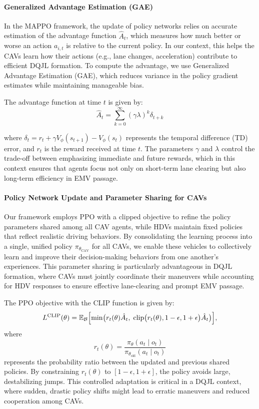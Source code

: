\paragraph{Generalized Advantage Estimation (GAE)}
In the MAPPO framework, the update of policy networks relies on accurate estimation of the advantage function $\hat{A}_t$, which measures how much better or worse an action $a_{i,t}$ is relative to the current policy. In our context, this helps the CAVs learn how their actions (e.g., lane changes, acceleration) contribute to efficient DQJL formation. To compute the advantage, we use Generalized Advantage Estimation (GAE), which reduces variance in the policy gradient estimates while maintaining manageable bias.

The advantage function at time $t$ is given by:
\begin{equation}\label{eqn:gae}
\hat{A}_t = \sum_{k=0}^{\infty} (\gamma \lambda)^k \delta_{t+k}
\end{equation}


where $\delta_t = r_t + \gamma V_{\phi}(s_{t+1}) - V_{\phi}(s_t)$ represents the temporal difference (TD) error, and $r_t$ is the reward received at time $t$. The parameters $\gamma$ and $\lambda$ control the trade-off between emphasizing immediate and future rewards, which in this context ensures that agents focus not only on short-term lane clearing but also long-term efficiency in EMV passage.


\paragraph{Policy Network Update and Parameter Sharing for CAVs}
Our framework employs PPO with a clipped objective to refine the policy parameters shared among all CAV agents, while HDVs maintain fixed policies that reflect realistic driving behaviors. By consolidating the learning process into a single, unified policy $\pi_{\theta_{\text{CAV}}}$ for all CAVs, we enable these vehicles to collectively learn and improve their decision-making behaviors from one another's experiences. This parameter sharing is particularly advantageous in DQJL formation, where CAVs must jointly coordinate their maneuvers while accounting for HDV responses to ensure effective lane-clearing and prompt EMV passage.

The PPO objective with the CLIP function is given by:
\begin{equation}\label{eqn:ppo_objectives}
    L^{\text{CLIP}}(\theta) = \mathbb{E}_{\mathcal{B}} \Bigl[ \min \bigl( r_t(\theta) \hat{A}_t,\; \text{clip}\bigl( r_t(\theta), 1 - \epsilon, 1 + \epsilon \bigr) \hat{A}_t \bigr) \Bigr],
\end{equation}
where
\[
r_t(\theta) = \frac{\pi_{\theta}(a_t \mid o_t)}{\pi_{\theta_{\text{old}}}(a_t \mid o_t)}
\]
represents the probability ratio between the updated and previous shared policies. By constraining \(r_t(\theta)\) to \([1-\epsilon, 1+\epsilon]\), the policy avoids large, destabilizing jumps. This controlled adaptation is critical in a DQJL context, where sudden, drastic policy shifts might lead to erratic maneuvers and reduced cooperation among CAVs.

